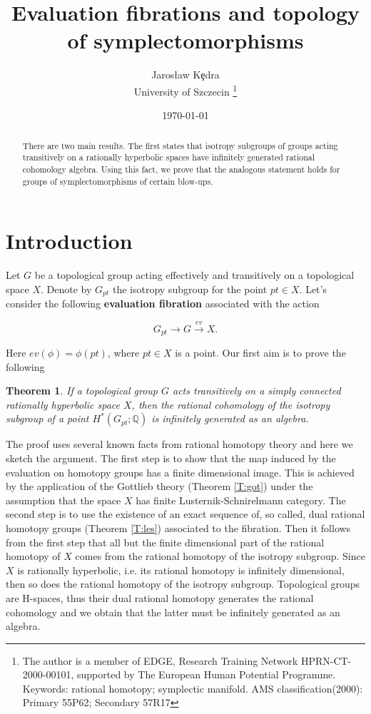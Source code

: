 \documentclass[a4paper,14pt]{article}
\title{Evaluation fibrations and topology of symplectomorphisms}
\author{Jaros\l aw K\c edra\\
        University of Szczecin
\thanks{
The author is a member of EDGE, Research Training Network
HPRN-CT-2000-00101, supported by The European Human Potential Programme.\newline
Keywords: rational homotopy; symplectic manifold.\newline
AMS classification(2000): Primary 55P62;  Secondary 57R17}}
\date{\today}
\newcommand{\B}[1]{\mathbb #1}
\newcommand{\map}[1]{\stackrel {#1}\longrightarrow}
\newcommand{\BS}{{\bigskip}}
\newtheorem{thm}[theorem]{Theorem}
\numberwithin{equation}{section}
\numberwithin{figure}{section}
\begin{document}



\maketitle

\begin{abstract}
There are two main results. The first states that isotropy
subgroups of groups acting transitively on a rationally 
hyperbolic spaces have infinitely generated rational
cohomology algebra. 
Using this fact, we prove that the analogous statement holds for
groups of symplectomorphisms
of certain blow-ups.
\end{abstract}

\BS






\section{Introduction}\label{S:intro}




Let $G$ be a topological group acting effectively and
transitively on a topological space $X$.  Denote by
${ G}_{pt}$ the isotropy subgroup for the point $pt\in X$.
Let's consider the  following 
{\bf evaluation fibration} associated with the action

$${ G} _{pt} \to { G} \map{ev} X.$$

\noindent
Here $ev(\phi ) = \phi (pt)$, where $pt \in X$ is a point.
Our first aim is to prove the following


\begin{thm}\label{T:iso}
If a topological group $ G$ acts transitively on a simply connected
rationally hyperbolic space $X$, then the rational cohomology
of the isotropy subgroup of a point $H^*( G_{pt};\B Q)$
is infinitely generated as an algebra.
\end{thm}

The proof uses several known facts from
rational homotopy theory and here we sketch the argument.
The first step is to show that the map induced
by the evaluation on homotopy groups
has a finite dimensional image. This is
achieved by the application of the
Gottlieb theory (Theorem \ref{T:got})
under the assumption that the space $X$ has finite
Lusternik-Schnirelmann category.
The second step is to use
the existence of an exact sequence of, so called,
dual rational homotopy groups (Theorem \ref{T:les}) associated
to the fibration. Then it follows from the first step
that all but the finite dimensional part of the rational
homotopy of $X$ comes from the rational homotopy
of the isotropy subgroup.
Since $X$ is rationally hyperbolic,
i.e. its rational homotopy is infinitely dimensional,
then so does the rational homotopy of the isotropy subgroup.
Topological groups are
H-spaces, thus their dual rational homotopy generates the
rational cohomology and we obtain that the latter must
be infinitely generated as an algebra.
\end{document}
